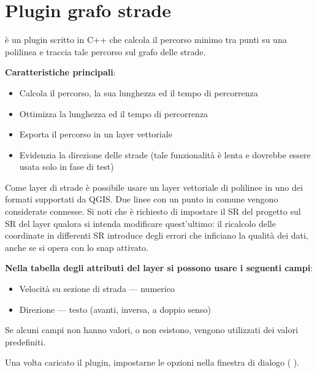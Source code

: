 
\section{Plugin grafo strade}\label{sec:roadgraph}



 è un plugin scritto in C++ che calcola il percorso minimo 
tra punti su una polilinea e traccia tale percorso sul grafo delle strade.

\textbf{Caratteristiche principali}:

\begin{itemize}
\item Calcola il percorso, la sua lunghezza ed il tempo di percorrenza
\item Ottimizza la lunghezza ed il tempo di percorrenza
\item Esporta il percorso in un layer vettoriale
\item Evidenzia la direzione delle strade (tale funzionalità è lenta e dovrebbe essere usata solo in fase di test)
\end{itemize}

Come layer di strade è possibile usare un layer vettoriale di polilinee in uno dei formati supportati da QGIS.
Due linee con un punto in comune vengono considerate connesse. Si noti che è richiesto di impostare il SR del 
progetto sul SR del layer qualora si intenda modificare quest'ultimo: il ricalcolo delle coordinate in differenti 
SR introduce degli errori che inficiano la qualità dei dati, anche se si opera con lo snap attivato. 

\textbf{Nella tabella degli attributi del layer si possono usare i seguenti campi}:

\begin{itemize}
\item Velocità su sezione di strada — numerico
\item Direzione — testo (avanti, inversa, a doppio senso)
\end{itemize}

Se alcuni campi non hanno valori, o non esistono, vengono utilizzati dei valori predefiniti.


Una volta caricato il plugin, impostarne le opzioni nella finestra di dialogo  
( \arrow {}). 

